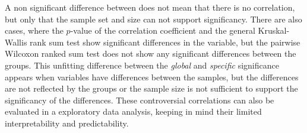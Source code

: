A non significant difference between does not mean that there is no correlation, but only that the sample set and size can not support significancy. There are also cases, where the $p$-value of the correlation coefficient and the general Kruskal-Wallis rank sum test show significant differences in the variable, but the pairwise Wilcoxon ranked sum test does not show any significant differences between the groups. This unfitting difference between the \textit{global} and \textit{specific} significance appears when variables have differences between the samples, but the differences are not reflected by the groups or the sample size is not sufficient to support the significancy of the differences. These controversial correlations can also be evaluated in a exploratory data analysis, keeping in mind their limited interpretability and predictability.

